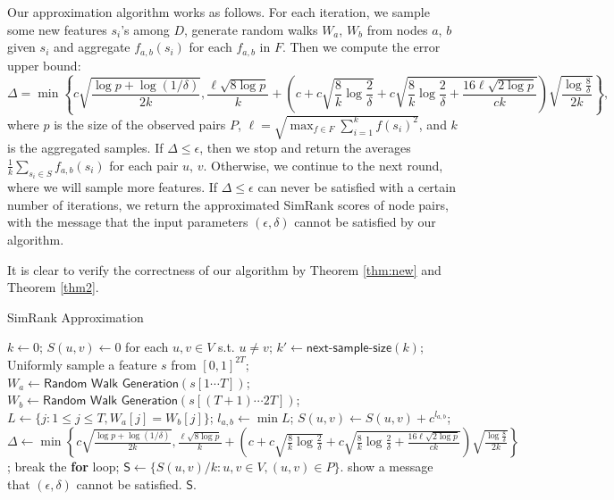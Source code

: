 \documentclass{article}
\begin{document}
Our approximation algorithm works as follows. For each iteration, we sample some new features $s_i$'s among $D$, generate random walks $W_a$, $W_b$ from nodes $a$, $b$ given $s_i$ and aggregate $f_{a,b}(s_i)$ for each $f_{a,b}$ in $F$. Then we compute the error upper bound:
$$\Delta = \min\left\{c\sqrt{\frac{\log p + \log(1/\delta)}{2k}}, \frac{\ell\sqrt{8\log p}}{k} +\left(c+c\sqrt{\frac{8}{k}\log \frac{2}{\delta}} + c\sqrt{\frac{8}{k}\log \frac{2}{\delta} + \frac{16\ell\sqrt{2\log p}}{ck}}\right)\sqrt{\frac{\log \frac{8}{\delta}}{2k}}\right\},$$
where $p$ is the size of the observed pairs $P$, $\ell = \sqrt{\max_{f\in F} \sum_{i=1}^k f(s_i)^2}$, and $k$ is the aggregated samples. 
If $\Delta \leq \epsilon$, then we stop and return the averages $\frac{1}{k}\sum_{s_i\in S}f_{a,b}(s_i)$ for each pair $u$, $v$. Otherwise, we continue to the next round, where we will sample more features. If $\Delta \leq \epsilon$ can never be satisfied with a certain number of iterations, we return the approximated SimRank scores of node pairs, with the message that the input parameters $(\epsilon,\delta)$ cannot be satisfied by our algorithm.

It is clear to verify the correctness of our algorithm by Theorem \ref{thm:new} and Theorem \ref{thm2}.

\begin{algorithm}[!t]
\caption{\textsf{SimRank Approximation}}
\label{alg:sra}
\renewcommand{\algorithmicrequire}{\textbf{Input:}}
\renewcommand{\algorithmicensure}{\textbf{Output:}}
\begin{algorithmic}
\State $k \gets 0$;
\State $S(u,v) \gets 0$ for each $u, v \in V$ s.t. $u\not= v$;
	\State $k' \gets \textsf{next-sample-size}(k)$;
		\State Uniformly sample a feature $s$ from $[0,1]^{2T}$;
			\State $W_a \gets \textsf{Random Walk Generation}(s[1\cdots T])$;
			\State $W_b \gets \textsf{Random Walk Generation}(s[(T+1)\cdots 2T])$;
			\State $L \gets \{j: 1\leq j\leq T, W_a[j] = W_b[j]\}$;
				\State $l_{a,b} \gets \min L$;
				\State $S(u,v) \gets S(u,v)+c^{l_{a,b}}$;
			\EndIf
		\EndFor
	\EndFor
	\State $\Delta \gets \min\left\{c\sqrt{\frac{\log p + \log(1/\delta)}{2k}}, \frac{\ell\sqrt{8\log p}}{k} +\left(c+c\sqrt{\frac{8}{k}\log \frac{2}{\delta}} + c\sqrt{\frac{8}{k}\log \frac{2}{\delta} + \frac{16\ell\sqrt{2\log p}}{ck}}\right)\sqrt{\frac{\log \frac{8}{\delta}}{2k}}\right\}$;
	\If {$\Delta \leq \epsilon$}
		\State break the {\bf for} loop;
	\EndIf
\EndFor
\State $\mathsf{S} \gets \{S(u,v)/k : u,v\in V, (u,v)\in P\}$.
	\State show a message that $(\epsilon,\delta)$ cannot be satisfied.
\EndIf
{} $\mathsf{S}$.
\end{algorithmic}
\end{algorithm}
\end{document}

